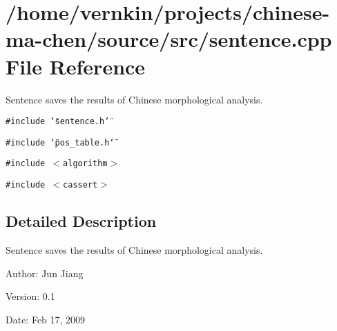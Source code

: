 \section{/home/vernkin/projects/chinese-ma-chen/source/src/sentence.cpp File Reference}
\label{sentence_8cpp}
Sentence saves the results of Chinese morphological analysis.  


{\tt \#include \char`\"{}sentence.h\char`\"{}}\par
{\tt \#include \char`\"{}pos\_\-table.h\char`\"{}}\par
{\tt \#include $<$algorithm$>$}\par
{\tt \#include $<$cassert$>$}\par


\subsection{Detailed Description}
Sentence saves the results of Chinese morphological analysis. 

\begin{Desc}
\item[Author:]Jun Jiang \end{Desc}
\begin{Desc}
\item[Version:]0.1 \end{Desc}
\begin{Desc}
\item[Date:]Feb 17, 2009 \end{Desc}
